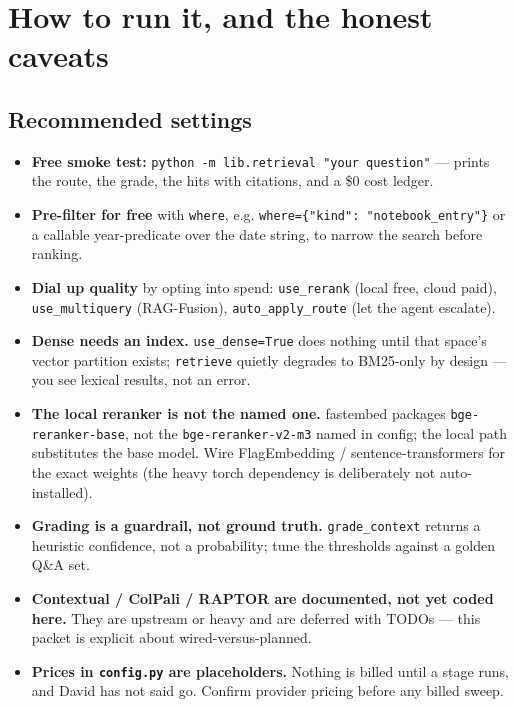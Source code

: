 \documentclass[11pt]{article}
\newcommand{\code}[1]{\texttt{#1}}
\newcommand{\file}[1]{\texttt{#1}}
\begin{document}
\section{How to run it, and the honest caveats}

\subsection*{Recommended settings}
\begin{itemize}[leftmargin=*]
  \item \textbf{Free smoke test:} \code{python -m lib.retrieval "your question"} --- prints the
        route, the grade, the hits with citations, and a \$0 cost ledger.
  \item \textbf{Pre-filter for free} with \code{where}, e.g.
        \code{where=\{"kind": "notebook\_entry"\}} or a callable year-predicate over the date string,
        to narrow the search before ranking.
  \item \textbf{Dial up quality} by opting into spend: \code{use\_rerank} (local free, cloud paid),
        \code{use\_multiquery} (RAG-Fusion), \code{auto\_apply\_route} (let the agent escalate).
\end{itemize}

\begin{caveatbox}
\begin{itemize}[leftmargin=*]
  \item \textbf{Dense needs an index.} \code{use\_dense=True} does nothing until that space's vector
        partition exists; \code{retrieve} quietly degrades to BM25-only by design --- you see lexical
        results, not an error.
  \item \textbf{The local reranker is not the named one.} fastembed packages
        \code{bge-reranker-base}, not the \code{bge-reranker-v2-m3} named in config; the local path
        substitutes the base model. Wire FlagEmbedding / sentence-transformers for the exact weights
        (the heavy torch dependency is deliberately not auto-installed).
  \item \textbf{Grading is a guardrail, not ground truth.} \code{grade\_context} returns a heuristic
        confidence, not a probability; tune the thresholds against a golden Q\&A set.
  \item \textbf{Contextual / ColPali / RAPTOR are documented, not yet coded here.} They are upstream
        or heavy and are deferred with TODOs --- this packet is explicit about wired-versus-planned.
  \item \textbf{Prices in \file{config.py} are placeholders.} Nothing is billed until a stage runs,
        and David has not said go. Confirm provider pricing before any billed sweep.
\end{itemize}
\end{caveatbox}
\end{document}
